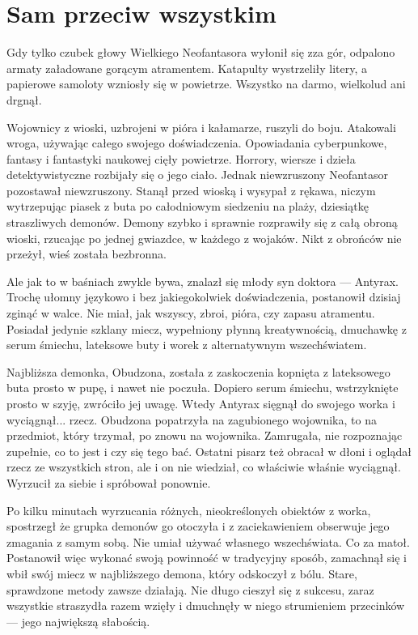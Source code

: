 \chapter{Sam przeciw wszystkim}


Gdy tylko czubek głowy Wielkiego Neofantasora wyłonił się zza gór, odpalono armaty załadowane gorącym atramentem.
Katapulty wystrzeliły litery, a papierowe samoloty wzniosły się w powietrze.
Wszystko na darmo, wielkolud ani drgnął.

Wojownicy z wioski, uzbrojeni w pióra i kałamarze, ruszyli do boju.
Atakowali wroga, używając całego swojego doświadczenia. Opowiadania cyberpunkowe, fantasy i fantastyki naukowej cięły powietrze.
Horrory, wiersze i dzieła detektywistyczne rozbijały się o jego ciało.
Jednak niewzruszony Neofantasor pozostawał niewzruszony.
Stanął przed wioską i wysypał z rękawa, niczym wytrzepując piasek z buta po całodniowym siedzeniu na plaży, dziesiątkę straszliwych demonów.
Demony szybko i sprawnie rozprawiły się z całą obroną wioski, rzucając po jednej gwiazdce, w każdego z wojaków.
Nikt z obrońców nie przeżył, wieś została bezbronna.

Ale jak to w baśniach zwykle bywa, znalazł się młody syn doktora --- Antyrax.
Trochę ułomny językowo i bez jakiegokolwiek doświadczenia, postanowił dzisiaj zginąć w walce.
Nie miał, jak wszyscy, zbroi, pióra, czy zapasu atramentu.
Posiadał jedynie szklany miecz, wypełniony płynną kreatywnością, dmuchawkę z serum śmiechu, lateksowe buty i worek z alternatywnym wszechświatem.

Najbliższa demonka, Obudzona, została z zaskoczenia kopnięta z lateksowego buta prosto w pupę, i nawet nie poczuła.
Dopiero serum śmiechu, wstrzyknięte prosto w szyję, zwróciło jej uwagę.
Wtedy Antyrax sięgnął do swojego worka i wyciągnął... rzecz.
Obudzona popatrzyła na zagubionego wojownika, to na przedmiot, który trzymał, po znowu na wojownika. Zamrugała, nie rozpoznając zupełnie, co to jest i czy się tego bać.
Ostatni pisarz też obracał w dłoni i oglądał rzecz ze wszystkich stron, ale i on nie wiedział, co właściwie właśnie wyciągnął.
Wyrzucił za siebie i spróbował ponownie.

Po kilku minutach wyrzucania różnych, nieokreślonych obiektów z worka, spostrzegł że grupka demonów go otoczyła i z zaciekawieniem obserwuje jego zmagania z samym sobą.
Nie umiał używać własnego wszechświata. Co za matoł.
Postanowił więc wykonać swoją powinność w tradycyjny sposób, zamachnął się i wbił swój miecz w najbliższego demona, który odskoczył z bólu. Stare, sprawdzone metody zawsze działają.
Nie długo cieszył się z sukcesu, zaraz wszystkie straszydła razem wzięły i dmuchnęły w niego strumieniem przecinków --- jego największą słabością.

